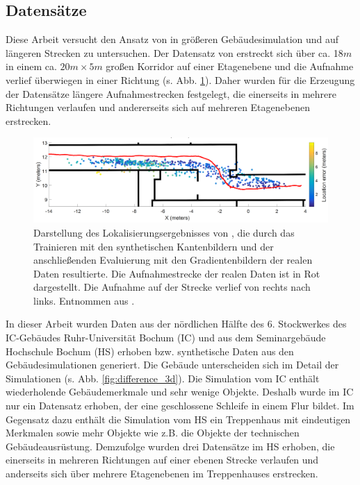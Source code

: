 \cleardoublepage



\subsection{Datensätze}
\label{subsec:datasets}
Diese Arbeit versucht den Ansatz von \citet{acharyaBIMPoseNetIndoorCamera2019} in größeren Gebäudesimulation und auf längeren Strecken zu untersuchen. Der Datensatz von \citet{acharyaBIMPoseNetIndoorCamera2019} erstreckt sich über ca. 18$m$ in einem ca. $20m \times 5m$ großen Korridor auf einer Etagenebene und die Aufnahme verlief überwiegen in einer Richtung (s. Abb. \ref{fig:acharya_traj}). Daher wurden für die Erzeugung der Datensätze längere Aufnahmestrecken festgelegt, die einerseits in mehrere Richtungen verlaufen und andererseits sich auf mehreren Etagenebenen erstrecken. 

\begin{figure}
	\centering
	\includegraphics[width=1.0\textwidth]{images/trajectories/acharya_traj.png}
	\caption{Darstellung des Lokalisierungsergebnisses von \citet{acharyaBIMPoseNetIndoorCamera2019}, die durch das Trainieren mit den synthetischen Kantenbildern und der anschließenden Evaluierung mit den Gradientenbildern der realen Daten resultierte. Die Aufnahmestrecke der realen Daten ist in Rot dargestellt. Die Aufnahme auf der Strecke verlief von rechts nach links. Entnommen aus \cite{acharyaBIMPoseNetIndoorCamera2019}.}
	\label{fig:acharya_traj}
\end{figure}




In dieser Arbeit wurden Daten aus der nördlichen Hälfte des 6. Stockwerkes des IC-Gebäudes Ruhr-Universität Bochum (IC) und aus dem Seminargebäude Hochschule Bochum (HS) erhoben bzw. synthetische Daten aus den Gebäudesimulationen generiert. Die Gebäude unterscheiden sich im Detail der Simulationen (s. Abb. \ref{fig:difference_3d}). Die Simulation vom IC enthält wiederholende Gebäudemerkmale und sehr wenige Objekte. Deshalb wurde im IC nur ein Datensatz erhoben, der eine geschlossene Schleife in einem Flur bildet. Im Gegensatz dazu enthält die Simulation vom HS ein Treppenhaus mit eindeutigen Merkmalen sowie mehr Objekte wie z.B. die Objekte der technischen Gebäudeausrüstung. Demzufolge wurden drei Datensätze im HS erhoben, die einerseits in mehreren Richtungen auf einer ebenen Strecke verlaufen und anderseits sich über mehrere Etagenebenen im Treppenhauses erstrecken.




